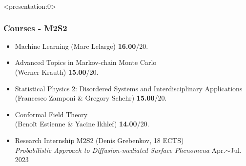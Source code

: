 \begin{frame}<presentation:0>
	\frametitle{Courses - M2S2}
	\begin{itemize}
		\setlength{\itemsep}{8pt}
		\item Machine Learning (Marc Lelarge) \hfill \textbf{16.00}/20.
		\item Advanced Topics in Markov-chain Monte Carlo \\ (Werner Krauth) \hfill \textbf{15.00}/20.
		\item Statistical Physics 2: Disordered Systems and Interdisciplinary Applications (Francesco Zamponi \& Gregory Schehr)  \hfill \textbf{15.00}/20.
		\item Conformal Field Theory \\ (Benoît Estienne \& Yacine Ikhlef) \hfill \textbf{14.00}/20.
		
		\bigskip
		
		\item Research Internship M2S2 (Denis Grebenkov, 18 ECTS) \\ \textit{Probabilistic Approach to Diffusion-mediated Surface Phenomena} \hfill Apr.$\sim$Jul. 2023
    \end{itemize}
\end{frame}